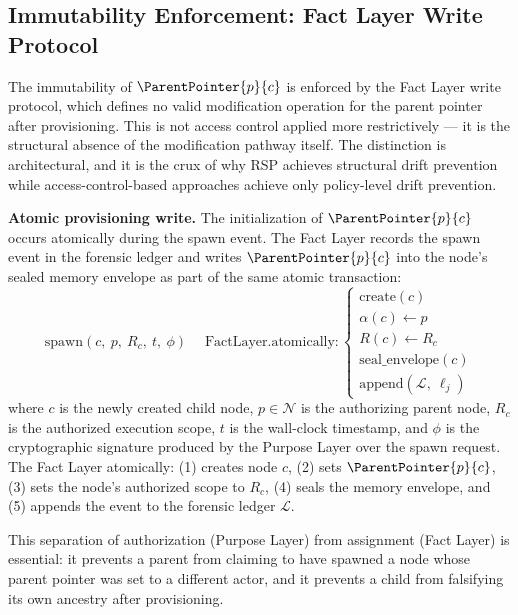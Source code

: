 \subsection{Immutability Enforcement: Fact Layer Write Protocol}
\label{sec:fact-layer-write-protocol}

The immutability of $\ParentPointer{p}{c}$ is enforced by the Fact Layer write protocol, which defines no valid modification operation for the parent pointer after provisioning. This is not access control applied more restrictively --- it is the structural absence of the modification pathway itself. The distinction is architectural, and it is the crux of why RSP achieves structural drift prevention while access-control-based approaches achieve only policy-level drift prevention.

\medskip
\noindent\textbf{Atomic provisioning write.} The initialization of $\ParentPointer{p}{c}$ occurs atomically during the spawn event. The Fact Layer records the spawn event in the forensic ledger and writes $\ParentPointer{p}{c}$ into the node's sealed memory envelope as part of the same atomic transaction:
\begin{equation}
\text{spawn}(c,\ p,\ R_c,\ t,\ \phi) \;\quad
\text{FactLayer.atomically}:
\begin{cases}
\text{create}(c) \\
\alpha(c) \leftarrow p \\
R(c) \leftarrow R_c \\
\text{seal\_envelope}(c) \\
\text{append}(\mathcal{L},\ \ell_j)
\end{cases}
\label{eq:atomic-spawn}
\end{equation}
where $c$ is the newly created child node, $p \in \mathcal{N}$ is the authorizing parent node, $R_c$ is the authorized execution scope, $t$ is the wall-clock timestamp, and $\phi$ is the cryptographic signature produced by the Purpose Layer over the spawn request. The Fact Layer atomically: (1) creates node $c$, (2) sets $\ParentPointer{p}{c}$, (3) sets the node's authorized scope to $R_c$, (4) seals the memory envelope, and (5) appends the event to the forensic ledger $\mathcal{L}$.

This separation of authorization (Purpose Layer) from assignment (Fact Layer) is essential: it prevents a parent from claiming to have spawned a node whose parent pointer was set to a different actor, and it prevents a child from falsifying its own ancestry after provisioning.

